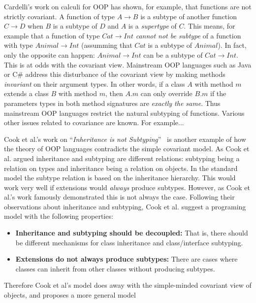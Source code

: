 Cardelli's work on calculi for OOP has shown, for example, that
functions are not strictly covariant.  A function of type $A \to B$ is
a subtype of another function $C \to D$ when $B$ is a subtype of $D$
and $A$ is a \emph{supertype} of $C$. This means, for example that a
function of type $Cat \to Int$ \emph{cannot not be subtype} of a
function with type $Animal \to Int$ (assumming that $Cat$ is a subtype
of $Animal$). In fact, only the opposite can
happen: $Animal \to Int$ can be a subtype of $Cat \to Int$.  This is
at odds with the covariant view. Mainstream OOP languages such as Java or C\# address this
disturbance of the covariant view by making methods \emph{invariant} on 
their argument types. In other words, if a class $A$ with method $m$
extends a class $B$ with method $m$, then $A.m$ can only override 
$B.m$ if the parameters types in both method signatures are \emph{exactly 
the same}. Thus mainstream OOP languages restrict the natural subtyping of
functions. Various other issues related to covariance are known. 
For example...

Cook et al.'s work on ``\emph{Inheritance is not Subtyping}''~\cite{}
is another example of how the theory of  OOP languages contradicts 
the simple covariant model. As Cook et al. argued inheritance and
subtyping are different relations: subtyping being a relation on types 
and inheritance being a relation on objects. In the standard model 
the subtype relation is based on the inheritance hierarchy. This 
would work very well if extensions would \emph{always} produce 
subtypes. However, as Cook et al.'s work famously demonstrated 
this is not always the case. Following their observations about 
inheritance and subtyping, Cook et al. suggest a programing model 
with the following properties:

\begin{itemize}

\item {\bf Inheritance and subtyping should be decoupled:} 
That is, there should be different mechanisms for class inheritance 
and class/interface subtyping. 

\item {\bf Extensions do not always produce subtypes:} 
There are cases where classes can inherit from other classes without 
producing subtypes. 

\end{itemize}

Therefore Cook et al's model does away with the simple-minded covariant 
view of objects, and proposes a more general model

